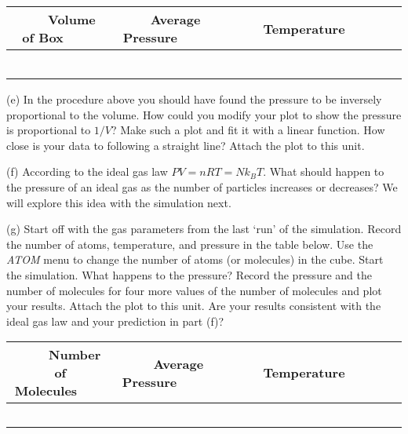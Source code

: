 \vspace{0.3cm}
{\centering \begin{tabular}{|c|c|c|}
\hline 
~~~~{}Volume of Box~~~~&
~~~~Average Pressure~~~&
~~~~~~Temperature~~~~~~~\\
\hline
\hline 
& &
\\
\hline 
& &
\\
\hline 
& &
\\
\hline 
& &
\\
\hline 
& &
\\
\hline 
& &
\\
\hline
\end{tabular}\par}
\vspace{0.3cm}

(e) In the procedure above you should have found the pressure to be inversely
proportional to the volume. How could you modify your plot to show
the pressure is proportional to \( 1/V \)? Make such a plot and fit it with a 
linear function. How close is your data to following a straight line? Attach 
the plot to this unit.
\vspace{1.4in}

(f) According to the ideal gas law \( PV = nRT = Nk_{B}T \). What
should happen to the pressure of an ideal gas as the number of particles
increases or decreases?
We will explore this idea with the simulation next.
\vspace{1.4in}

(g) Start off with the gas parameters from the last `run' of the 
simulation.
Record the number of atoms, temperature, and pressure in the table below.
Use the {\it ATOM} menu to change the number of atoms (or molecules) in the cube.
Start
the simulation. What happens to the pressure? Record the pressure
and the number of molecules for four more values of the number of
molecules and plot your results. Attach the plot to this unit. Are your results consistent with
the ideal gas law and your prediction in part (f)?
\vspace{1.5in}

\vspace{0.3cm}
{\centering \begin{tabular}{|c|c|c|}
\hline 
~~~~Number of Molecules~~~~&
~~~~Average Pressure~~~~&
~~~~~~Temperature~~~~~~~\\
\hline
\hline 
& &
\\
\hline 
& &
\\
\hline 
& &
\\
\hline 
& &
\\
\hline 
& &
\\
\hline
\end{tabular}\par}
\vspace{0.3cm}


